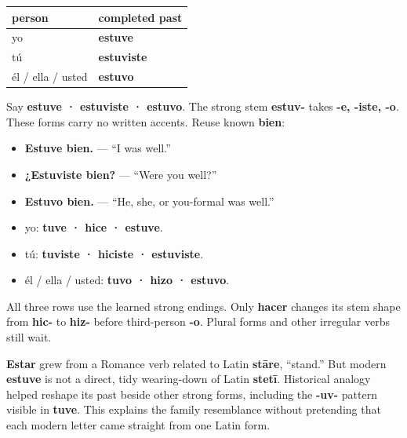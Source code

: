 \begin{grammarlens}[title={Grammar Lens: estar in the completed past}]
\noindent
\begin{tabularx}{\linewidth}{@{}>{\raggedright\arraybackslash}X>{\raggedright\arraybackslash}X@{}}
\toprule
\textbf{person} & \textbf{completed past} \\
\midrule
yo & \textbf{estuve} \\
tú & \textbf{estuviste} \\
él / ella / usted & \textbf{estuvo} \\
\bottomrule
\end{tabularx}

Say \textbf{estuve · estuviste · estuvo}. The strong stem \textbf{estuv-} takes \textbf{-e, -iste, -o}. These forms carry no written accents. Reuse known \textbf{bien}:

\begin{itemize}
\raggedright
  \item \textbf{Estuve bien.} — “I was well.”
  \item \textbf{¿Estuviste bien?} — “Were you well?”
  \item \textbf{Estuvo bien.} — “He, she, or you-formal was well.”
\end{itemize}
\end{grammarlens}

\begin{grammarlens}[title={Grammar Lens: three strong singular rows}]
\begin{itemize}
\raggedright
  \item yo: \textbf{tuve · hice · estuve}.
  \item tú: \textbf{tuviste · hiciste · estuviste}.
  \item él / ella / usted: \textbf{tuvo · hizo · estuvo}.
\end{itemize}

All three rows use the learned strong endings. Only \textbf{hacer} changes its stem shape from \textbf{hic-} to \textbf{hiz-} before third-person \textbf{-o}. Plural forms and other irregular verbs still wait.
\end{grammarlens}

\begin{cousinweb}
\textbf{Estar} grew from a Romance verb related to Latin \textbf{stāre}, “stand.” But modern \textbf{estuve} is not a direct, tidy wearing-down of Latin \textbf{stetī}. Historical analogy helped reshape its past beside other strong forms, including the \textbf{-uv-} pattern visible in \textbf{tuve}. This explains the family resemblance without pretending that each modern letter came straight from one Latin form.
\end{cousinweb}

